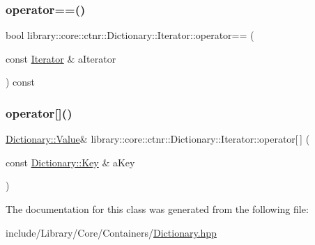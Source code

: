 \subsubsection{\texorpdfstring{operator==()}{operator==()}}
{\footnotesize\ttfamily bool library\+::core\+::ctnr\+::\+Dictionary\+::\+Iterator\+::operator== (\begin{DoxyParamCaption}\item[{const \hyperlink{classlibrary_1_1core_1_1ctnr_1_1Dictionary_1_1Iterator}{Iterator} \&}]{a\+Iterator }\end{DoxyParamCaption}) const}

\mbox{\label{classlibrary_1_1core_1_1ctnr_1_1Dictionary_1_1Iterator_a89151ad07a4b475b62673fd933535714}} 
\subsubsection{\texorpdfstring{operator[]()}{operator[]()}}
{\footnotesize\ttfamily \hyperlink{classlibrary_1_1core_1_1ctnr_1_1Dictionary_a3baf6692694e4fc27cb399ac083c88ea}{Dictionary\+::\+Value}\& library\+::core\+::ctnr\+::\+Dictionary\+::\+Iterator\+::operator\mbox{[}$\,$\mbox{]} (\begin{DoxyParamCaption}\item[{const \hyperlink{classlibrary_1_1core_1_1ctnr_1_1Dictionary_a987cae687cce70d81a2a483c5e05e842}{Dictionary\+::\+Key} \&}]{a\+Key }\end{DoxyParamCaption})}



The documentation for this class was generated from the following file\+:\begin{DoxyCompactItemize}
\item 
include/\+Library/\+Core/\+Containers/\hyperlink{Dictionary_8hpp}{Dictionary.\+hpp}\end{DoxyCompactItemize}
